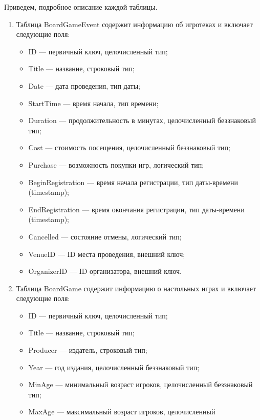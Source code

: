Приведем, подробное описание каждой таблицы.
\begin{enumerate}
    \item Таблица BoardGameEvent содержит информацию об игротеках и включает
        следующие поля:
        \begin{itemize}[leftmargin=\parindent]
            \item ID --- первичный ключ, целочисленный тип;
            \item Title --- название, строковый тип;
            \item Date --- дата проведения, тип даты;
            \item StartTime --- время начала, тип времени;
            \item Duration --- продолжительность в минутах, целочисленный
                беззнаковый тип;
            \item Cost --- стоимость посещения, целочисленный беззнаковый тип;
            \item Purchase --- возможность покупки игр, логический тип;
            \item BeginRegistration --- время начала регистрации, тип
                даты-времени (timestamp);
            \item EndRegistration --- время окончания регистрации, тип
                даты-времени (timestamp);
            \item Cancelled --- состояние отмены, логический тип;
            \item VenueID --- ID места проведения, внешний ключ;
            \item OrganizerID --- ID организатора, внешний ключ.
        \end{itemize}
    \item Таблица BoardGame содержит информацию о настольных играх и включает
        следующие поля:
        \begin{itemize}[leftmargin=\parindent]
            \item ID --- первичный ключ, целочисленный тип;
            \item Title --- название, строковый тип;
            \item Producer --- издатель, строковый тип;
            \item Year --- год издания, целочисленный беззнаковый тип;
            \item MinAge --- минимальный возраст игроков, целочисленный
                беззнаковый тип;
            \item MaxAge --- максимальный возраст игроков, целочисленный

\end{itemize}
\end{enumerate}
